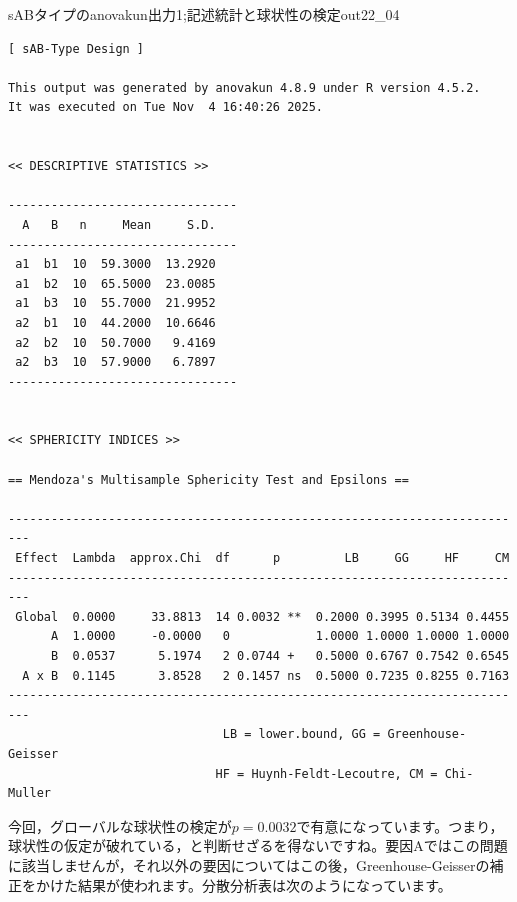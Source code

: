\documentclass{ltjbook}
\begin{document}
\begin{Rscreen}{sABタイプのanovakun出力1;記述統計と球状性の検定}{out22_04}
\begin{verbatim}
[ sAB-Type Design ]

This output was generated by anovakun 4.8.9 under R version 4.5.2.
It was executed on Tue Nov  4 16:40:26 2025.

 
<< DESCRIPTIVE STATISTICS >>

--------------------------------
  A   B   n     Mean     S.D. 
--------------------------------
 a1  b1  10  59.3000  13.2920 
 a1  b2  10  65.5000  23.0085 
 a1  b3  10  55.7000  21.9952 
 a2  b1  10  44.2000  10.6646 
 a2  b2  10  50.7000   9.4169 
 a2  b3  10  57.9000   6.7897 
--------------------------------


<< SPHERICITY INDICES >>

== Mendoza's Multisample Sphericity Test and Epsilons ==

-------------------------------------------------------------------------
 Effect  Lambda  approx.Chi  df      p         LB     GG     HF     CM 
-------------------------------------------------------------------------
 Global  0.0000     33.8813  14 0.0032 **  0.2000 0.3995 0.5134 0.4455 
      A  1.0000     -0.0000   0            1.0000 1.0000 1.0000 1.0000 
      B  0.0537      5.1974   2 0.0744 +   0.5000 0.6767 0.7542 0.6545 
  A x B  0.1145      3.8528   2 0.1457 ns  0.5000 0.7235 0.8255 0.7163 
-------------------------------------------------------------------------
                              LB = lower.bound, GG = Greenhouse-Geisser
                             HF = Huynh-Feldt-Lecoutre, CM = Chi-Muller
\end{verbatim}
\end{Rscreen}

今回，グローバルな球状性の検定が$p=0.0032$で有意になっています。つまり，球状性の仮定が破れている，と判断せざるを得ないですね。要因Aではこの問題に該当しませんが，それ以外の要因についてはこの後，Greenhouse-Geisserの補正をかけた結果が使われます。分散分析表は次のようになっています。
\end{document}
